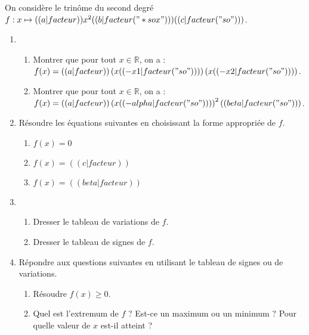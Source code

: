 \exercice
On considère le trinôme du second degré $f: x\mapsto (( a|facteur )) x^2 (( b|facteur("*sox") )) (( c|facteur("so") ))$.

\begin{enumerate}
\item
\begin{enumerate}
    \item Montrer que pour tout $x\in\mathbb{R}$, on a : $f(x)=(( a|facteur )) \left( x (( -x1|facteur("so") )) \right) \left( x (( -x2|facteur("so") )) \right) $.
    \item Montrer que pour tout $x\in\mathbb{R}$, on a : $f(x)=(( a|facteur ))\left( x (( -alpha|facteur("so") )) \right)^2 (( beta|facteur("so") ))$.
\end{enumerate}
\item Résoudre les équations suivantes en choisissant la forme appropriée de $f$.
\begin{enumerate}
\item $f(x)=0$
\item $f(x)=(( c|facteur ))$
\item $f(x)=(( beta|facteur ))$
\end{enumerate}
\item
\begin{enumerate}
\item Dresser le tableau de variations de $f$.
\item Dresser le tableau de signes de $f$.
\end{enumerate}
\item Répondre aux questions suivantes en utilisant le tableau de signes ou de variations.
\begin{enumerate}
\item Résoudre $f(x)\geq0$.
\item Quel est l'extremum de $f$ ? Est-ce un maximum ou un minimum ? Pour quelle valeur de $x$ est-il atteint ?
\end{enumerate}
\end{enumerate}
